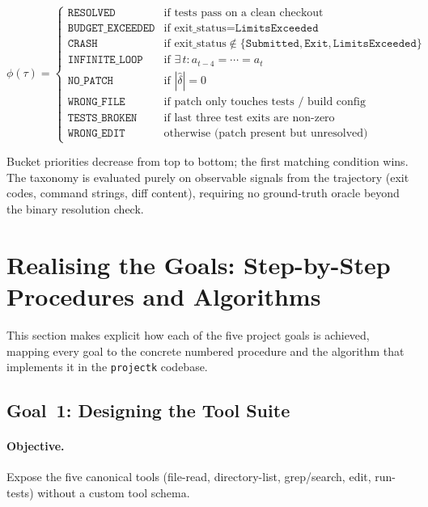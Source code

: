 \documentclass[11pt]{article}
\begin{document}
\begin{equation}
  \phi(\tau) =
  \begin{cases}
    \texttt{RESOLVED}           & \text{if tests pass on a clean checkout} \\
    \texttt{BUDGET\_EXCEEDED}   & \text{if exit\_status} = \texttt{LimitsExceeded} \\
    \texttt{CRASH}              & \text{if exit\_status} \notin \{\texttt{Submitted}, \texttt{Exit}, \texttt{LimitsExceeded}\} \\
    \texttt{INFINITE\_LOOP}     & \text{if } \exists\, t: a_{t-4} = \cdots = a_t \\
    \texttt{NO\_PATCH}          & \text{if } |\hat{\delta}| = 0 \\
    \texttt{WRONG\_FILE}        & \text{if patch only touches tests / build config} \\
    \texttt{TESTS\_BROKEN}      & \text{if last three test exits are non-zero} \\
    \texttt{WRONG\_EDIT}        & \text{otherwise (patch present but unresolved)}
  \end{cases}
  \label{eq:taxonomy}
\end{equation}

Bucket priorities decrease from top to bottom; the first matching condition
wins.  The taxonomy is evaluated purely on observable signals from the
trajectory (exit codes, command strings, diff content), requiring no
ground-truth oracle beyond the binary resolution check.

\section{Realising the Goals: Step-by-Step Procedures and Algorithms}
\label{sec:goals}

This section makes explicit how each of the five project goals is achieved,
mapping every goal to the concrete numbered procedure and the algorithm that
implements it in the \texttt{projectk} codebase.

\subsection{Goal~1: Designing the Tool Suite}
\label{sec:goal-tools}

\paragraph{Objective.}
Expose the five canonical tools (file-read, directory-list, grep/search,
edit, run-tests) without a custom tool schema.
\end{document}
